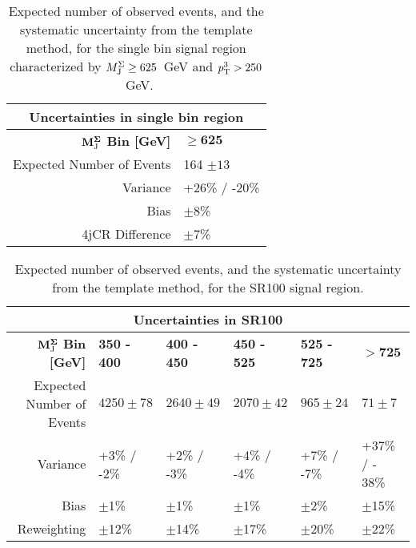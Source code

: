 \begin{table}[!ht]
\begin{center}\renewcommand\arraystretch{1.6}
\begin{tabular}{r|l}

  
\multicolumn{2}{c}{Uncertainties in single bin region} \\
\hline \hline

$\mathbf{M_{\textrm{J}}^{\Sigma}}$ \textbf{Bin [GeV]}  & $\mathbf{\geq 625}$ \\
\hline
 Expected Number of Events & 164 $\pm 13$  \\
 Variance & +26\% / -20\% \\
 Bias & $\pm 8$\% \\
 4jCR Difference  & $\pm 7$\% \\
 \hline \hline
  \end{tabular}
  
  \caption{Expected number of observed events, and the systematic uncertainty from the template method, for the single bin signal region characterized by $M_{\textrm{J}}^{\Sigma} \geq 625$~GeV and $p_{\text{T}}^{3}>250$~GeV. \label{tab:backSR1}}
\end{center}
\end{table}


\begin{table}[!ht]
\begin{center}\renewcommand\arraystretch{1.6}
\begin{tabular}{r|l |l |l |l |l }

  
\multicolumn{6}{c}{Uncertainties in SR100} \\
\hline \hline

$\mathbf{M_{\textrm{J}}^{\Sigma}}$ \textbf{Bin [GeV]}  & \textbf{350 - 400} & \textbf{400 - 450} & \textbf{450 - 525} & \textbf{525 - 725} & $\mathbf{>725}$ \\ \cline{2-6}
\hline
 Expected Number of Events & $4250\pm78$ & $2640\pm49$ & $2070\pm42$ & $965\pm24$ & $71\pm7$ \\
 Variance & +3\% / -2\% & +2\% / -3\% & +4\% / -4\% & +7\% / -7\% & +37\% / - 38\% \\
 Bias & $\pm$1\% & $\pm$1\% & $\pm$1\% & $\pm$2\% & $\pm$15\% \\
 Reweighting& $\pm$12\% & $\pm$14\% & $\pm$17\% & $\pm$20\% & $\pm$22\% \\
 \hline \hline
  \end{tabular}
  
  \caption{Expected number of observed events, and the systematic uncertainty from the template method, for the SR100 signal region. \label{tab:backSR100}}
\end{center}
\end{table}

